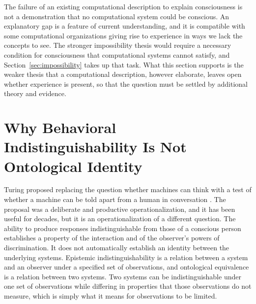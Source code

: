 \documentclass[12pt]{article}
\theoremstyle{definition}
\begin{document}
The failure of an existing computational description to explain consciousness is not a demonstration that no computational system could be conscious. An explanatory gap is a feature of current understanding, and it is compatible with some computational organizations giving rise to experience in ways we lack the concepts to see. The stronger impossibility thesis would require a necessary condition for consciousness that computational systems cannot satisfy, and Section~\ref{sec:impossibility} takes up that task. What this section supports is the weaker thesis that a computational description, however elaborate, leaves open whether experience is present, so that the question must be settled by additional theory and evidence.

\section{Why Behavioral Indistinguishability Is Not Ontological Identity}
\label{sec:behavior}

Turing proposed replacing the question whether machines can think with a test of whether a machine can be told apart from a human in conversation \cite{turing1950}. The proposal was a deliberate and productive operationalization, and it has been useful for decades, but it is an operationalization of a different question. The ability to produce responses indistinguishable from those of a conscious person establishes a property of the interaction and of the observer's powers of discrimination. It does not automatically establish an identity between the underlying systems. Epistemic indistinguishability is a relation between a system and an observer under a specified set of observations, and ontological equivalence is a relation between two systems. Two systems can be indistinguishable under one set of observations while differing in properties that those observations do not measure, which is simply what it means for observations to be limited.
\end{document}
